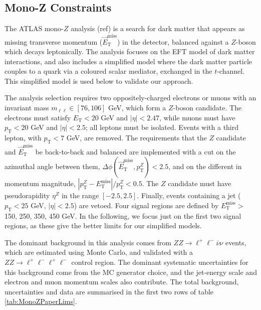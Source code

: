 \subsection{Mono-Z Constraints}
\label{monoZ_constraints}
\begin{flushleft}

The ATLAS mono-$Z$ analysis (ref) is a search for dark matter that appears as missing transverse momentum ($\vec{E}_{\mathrm{T}}^{\mathrm{miss}}$) in the detector, balanced against a $Z$-boson which decays leptonically. The analysis focuses on the EFT model of dark matter interactions, and also includes a simplified model where the dark matter particle couples to a quark via a coloured scalar mediator, exchanged in the $t$-channel. This simplified model is used below to validate our approach. 

The analysis selection requires two oppositely-charged electrons or muons with an invariant mass $m_{\ell \ell} \in [76, 106]$ GeV, which form a $Z$-boson candidate. The electrons must satisfy $E_{\mathrm{T}} < 20$ GeV and $|\eta| < 2.47$, while muons must have $p_{\mathrm{T}} < 20$ GeV and $|\eta| < 2.5$; all leptons must be isolated. Events with a third lepton, with $p_{\mathrm{T}} < 7$ GeV, are removed. The requirements that the $Z$ candidate and $\vec{E}_{\mathrm{T}}^{\mathrm{miss}}$ be back-to-back and balanced are implemented with a cut on the azimuthal angle between them, $\Delta \phi (\vec{E}_{\mathrm{T}}^{\mathrm{miss}}, p_{\mathrm{T}}^Z) < 2.5$, and on the different in momentum magnitude, $|p_{\mathrm{T}}^Z - E_{\mathrm{T}}^{\mathrm{miss}}| / p_{\mathrm{T}}^Z < 0.5$. The $Z$ candidate must have pseudorapidity $\eta^Z$ in the range $[-2.5, 2.5]$. Finally, events containing a jet ($p_{\mathrm{T}} < 25$ GeV, $|\eta| < 2.5$) are vetoed. Four signal regions are defined by $E_{\mathrm{T}}^{\mathrm{miss}} > $ 150, 250, 350, 450 GeV. In the following, we focus just on the first two signal regions, as these give the better limits for our simplified models.

The dominant background in this analysis comes from $ZZ \rightarrow \ell^+ \ell^- \bar{\nu} \nu$ events, which are estimated using Monte Carlo, and validated with a $ZZ \rightarrow \ell^+ \ell^- \ell^+ \ell^-$ control region. The dominant systematic uncertainties for this background come from the MC generator choice, and the jet-energy scale and electron and muon momentum scales also contribute. The total background, uncertainties and data are summarised in the first two rows of table \ref{tab:MonoZPaperLims}.


\end{flushleft}
